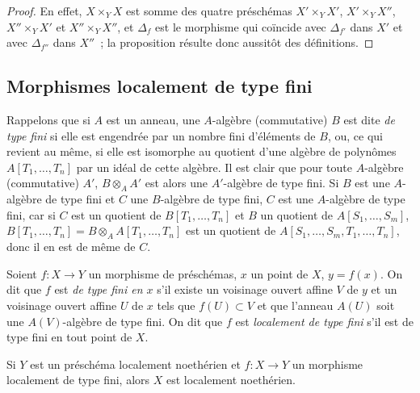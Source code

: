 \begin{proof}
En effet, $X\times_YX$ est somme des quatre préschémas
$X'\times_YX'$, $X'\times_YX''$, $X''\times_YX'$ et $X''\times_YX''$, et
$\Delta_f$ est le morphisme qui coïncide avec $\Delta_{f'}$ dans $X'$ et avec
$\Delta_{f''}$ dans $X''$~; la proposition résulte donc aussitôt des
définitions.
\end{proof}

\subsection{Morphismes localement de type fini}
\label{subsection:IV.1.3-fr}

\begin{env}[1.3.1]
\label{IV.1.3.1-fr}
Rappelons que si $A$ est un anneau, une $A$-algèbre (commutative) $B$ est dite
\emph{de type fini} si elle est engendrée par un nombre fini d'éléments de
$B$, ou, ce qui revient au même, si elle est isomorphe au quotient d'une
algèbre de polynômes $A[T_1,\ldots,T_n]$ par un idéal de cette algèbre. Il est
clair que pour toute $A$-algèbre (commutative) $A'$,
$B\otimes_AA'$ est alors une $A'$-algèbre de type fini. Si $B$ est une
$A$-algèbre de type fini et $C$ une $B$-algèbre de type fini, $C$ est une
$A$-algèbre de type fini, car si $C$ est un quotient de
$B[T_1,\ldots,T_n]$ et $B$ un quotient de $A[S_1,\ldots,S_m]$,
$B[T_1,\ldots,T_n]=B\otimes_AA[T_1,\ldots,T_n]$ est un quotient de
$A[S_1,\ldots,S_m,T_1,\ldots,T_n]$, donc il en est de même de $C$.
\end{env}

\begin{definition}[1.3.2]
\label{IV.1.3.2-fr}
Soient $f:X\to Y$ un morphisme de préschémas, $x$ un point de $X$,
$y=f(x)$. On dit que $f$ est \emph{de type fini en $x$} s'il existe un
voisinage ouvert affine $V$ de $y$ et un voisinage ouvert affine $U$ de $x$
tels que $f(U)\subset V$ et que l'anneau $A(U)$ soit une $A(V)$-algèbre de
type fini. On dit que $f$ est \emph{localement de type fini} s'il est de type
fini en tout point de $X$.
\end{definition}


\begin{proposition}[1.3.3]
\label{IV.1.3.3-fr}
Si $Y$ est un préschéma localement noethérien et $f:X\to Y$ un morphisme
localement de type fini, alors $X$ est localement noethérien.
\end{proposition}

